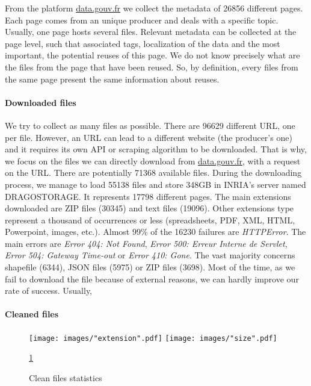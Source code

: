 \documentclass[a4paper]{article}
\begin{document}
	From the platform \href{http://www.data.gouv.fr/fr/}{data.gouv.fr} we collect the metadata of 26856 different pages. Each page comes from an unique producer and deals with a specific topic. Usually, one page hosts several files. Relevant metadata can be collected at the page level, such that associated tags, localization of the data and the most important, the potential reuses of this page. We do not know precisely what are the files from the page that have been reused. So, by definition, every files from the same page present the same information about reuses.
	
	\paragraph{Downloaded files}
	
	We try to collect as many files as possible. There are 96629 different URL, one per file. However, an URL can lead to a different website (the producer's one) and it requires its own API or scraping algorithm to be downloaded. That is why, we focus on the files we can directly download from \href{http://www.data.gouv.fr/fr/}{data.gouv.fr}, with a request on the URL. There are potentially 71368 available files. During the downloading process, we manage to load 55138 files and store 348GB in INRIA's server named DRAGOSTORAGE. It represents 17798 different pages. The main extensions downloaded are ZIP files (30345) and text files (19096). Other extensions type represent a thousand of occurrences or less (spreadsheets, PDF, XML, HTML, Powerpoint, images, etc.). Almost 99\% of the 16230 failures are \emph{HTTPError}. The main errors are \emph{Error 404: Not Found}, \emph{Error 500: Erreur Interne de Servlet}, \emph{Error 504: Gateway Time-out} or \emph{Error 410: Gone}. The vast majority concerns shapefile (6344), JSON files (5975) or ZIP files (3698). Most of the time, as we fail to download the file because of external reasons, we can hardly improve our rate of success. Usually, 
	
	\paragraph{Cleaned files}
	
	\begin{figure}[]
		\texttt{[image: images/"extension".pdf]}
		\label{fig:Original extension}
		\endminipage\hfill
		\texttt{[image: images/"size".pdf]}
		\label{fig:size}
		\endminipage
		\caption{Clean files statistics}
		\label{fig:clean}
		\ref{fig:clean}
	\end{figure}
	
\end{document}
